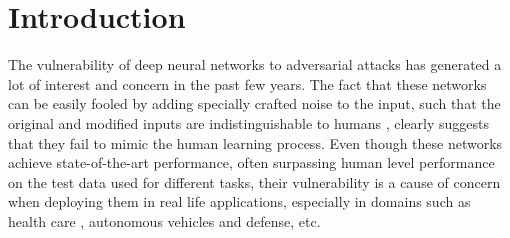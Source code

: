 \documentclass[letterpaper]{article} %
\begin{document}
\section{Introduction}
\label{intro}
The vulnerability of deep neural networks to adversarial attacks has generated a lot of interest and concern in the past few years. The fact that these networks can be easily fooled by adding specially crafted noise to the input, such that the original and modified inputs are indistinguishable to humans , clearly suggests that they fail to mimic the human learning process. Even though these networks achieve state-of-the-art performance, often surpassing human level performance  on the test data used for different tasks, their vulnerability is a cause of concern when deploying them in real life applications, especially in domains such as health care , autonomous vehicles  and defense, etc.
\end{document}

